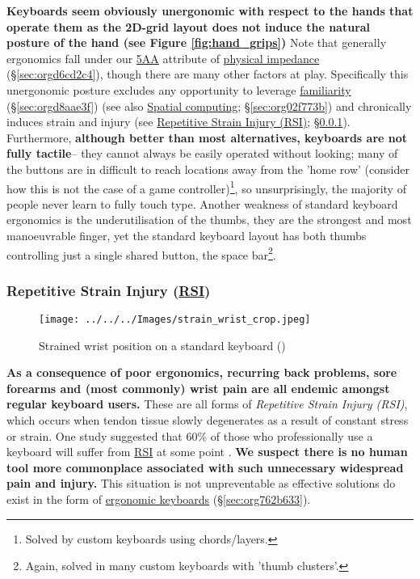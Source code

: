 \documentclass[logo,bsc,singlespacing,parskip]{infthesis}
\begin{document}
\textbf{Keyboards seem obviously unergonomic with respect to the hands that operate them as the 2D-grid layout does not induce the natural posture of the hand (see Figure \ref{fig:hand_grips})}
Note that generally ergonomics fall under our \hyperref[org85f90e8]{5AA} attribute of \hyperref[sec:orgd6cd2c4]{physical impedance} (\S \ref{sec:orgd6cd2c4}), though there are many other factors at play.
Specifically this unergonomic posture excludes any opportunity to leverage \hyperref[sec:orgd8aae3f]{familiarity} (\S \ref{sec:orgd8aae3f})
(see also \hyperref[sec:org02f773b]{Spatial computing}; \S \ref{sec:org02f773b}) and chronically induces strain and injury (see \hyperref[sec:orgd11dc5d]{Repetitive Strain Injury (RSI)}; \S \ref{sec:orgd11dc5d}).
Furthermore, \textbf{although better than most alternatives, keyboards are not fully tactile}-- they cannot always be easily operated without looking; many of the buttons are in difficult to reach locations away from the 'home row' (consider how this is not the case of a game controller)\footnote{Solved by custom keyboards using chords/layers.}, so unsurprisingly, the majority of people never learn to fully touch type.
Another weakness of standard keyboard ergonomics is the underutilisation of the thumbs,  they are the strongest and most manoeuvrable finger, yet the standard keyboard layout has both thumbs controlling just a single shared button, the space bar\footnote{Again, solved in many custom keyboards with 'thumb clusters'.}.

\subsubsection{Repetitive Strain Injury (\hyperref[orgdb95c62]{RSI})}
\label{sec:orgd11dc5d}
\begin{figure}[h]
\centering
\texttt{[image: ../../../Images/strain\_wrist\_crop.jpeg]}
\caption{Strained wrist position on a standard keyboard (\autocite{ZergoFreedomErgonomics})}
\end{figure}

\textbf{As a consequence of  poor ergonomics, recurring back problems, sore forearms and (most commonly) wrist pain are all endemic amongst regular keyboard users.}
These are all forms of \emph{Repetitive Strain Injury (\label{orgdb95c62}RSI)}, which   occurs when tendon tissue slowly degenerates as a result of constant stress or strain.
One study suggested that 60\% of those who professionally use a keyboard will suffer from \hyperref[orgdb95c62]{RSI} at some point \autocite{namayandegiEVALUATIONMETHODWHICH2015}.
\textbf{We suspect there is no human tool more commonplace associated with such unnecessary widespread pain and injury.}
This situation is not unpreventable as effective solutions do exist in the form of \hyperref[sec:org762b633]{ergonomic keyboards} (\S \ref{sec:org762b633}).
\end{document}
